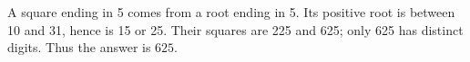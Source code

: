 A square ending in 5 comes from a root ending in 5. Its positive root is between 10 and 31, hence is 15 or 25. Their squares are 225 and 625; only 625 has distinct digits. Thus the answer is $\boxed{625}$.
